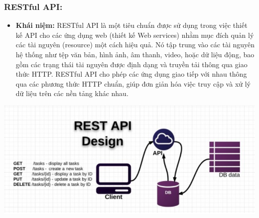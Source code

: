 \subsubsection{RESTful API:}
\begin{itemize}
    \item \textbf{Khái niệm:}  RESTful API là một tiêu chuẩn được sử dụng trong việc thiết kế API cho các ứng dụng web (thiết kế Web services) nhằm mục đích quản lý các tài nguyên (resource) một cách hiệu quả. Nó tập trung vào các tài nguyên hệ thống như tệp văn bản, hình ảnh, âm thanh, video, hoặc dữ liệu động, bao gồm các trạng thái tài nguyên được định dạng và truyền tải thông qua giao thức HTTP. RESTful API cho phép các ứng dụng giao tiếp với nhau thông qua các phương thức HTTP chuẩn, giúp đơn giản hóa việc truy cập và xử lý dữ liệu trên các nền tảng khác nhau.
\end{itemize}

\includegraphics[width=\textwidth]{imgs/API.png}


